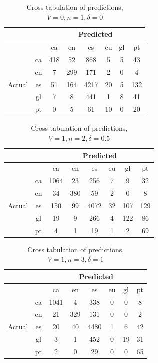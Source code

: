 \documentclass[runningheads]{llncs}
\begin{document}
\begin{table}
	\centering
	\caption{Cross tabulation of predictions, $V=0, n=1, \delta=0$}
	\begin{tabular}{|c|c|c|c|c|c|c|c|} \hline
        & & \multicolumn{6}{c|}{Predicted} \\ \hline
		& &    ca &   en &    es &  eu &   gl &   pt \\ \hline
		\multirow{6}{*}{Actual} & ca   &  418 &   52 &   868 &   5 &   5 &   43 \\
		& en   &    7 &  299 &   171 &   2 &   0 &    4 \\
		& es   &   51 &  164 &  4217 &  20 &   5 &  132 \\
		& gl   &    7 &    8 &   441 &   1 &   8 &   41 \\
		& pt   &    0 &    5 &    61 &  10 &   0 &   20 \\ \hline
		\end{tabular}

\end{table}
\begin{table}
	\centering
	\caption{Cross tabulation of predictions, $V=1, n=2, \delta=0.5$}
	\begin{tabular}{|c|c|c|c|c|c|c|c|} \hline
	    & & \multicolumn{6}{c|}{Predicted} \\ \hline
		& &    ca &   en &    es &  eu &   gl &   pt \\ \hline
		\multirow{6}{*}{Actual} & ca   &  1064 &   23 &   256 &   7 &    9 &   32 \\
		& en   &    34 &  380 &    59 &   2 &    0 &    8 \\
		& es   &   150 &   99 &  4072 &  32 &  107 &  129 \\
		& gl   &    19 &    9 &   266 &   4 &  122 &   86 \\
		& pt   &     4 &    1 &    19 &   1 &    2 &   69 \\ \hline
	\end{tabular}
\end{table}

\begin{table}
	\centering
	\caption{Cross tabulation of predictions, $V=1, n=3, \delta=1$}
	\begin{tabular}{|c|c|c|c|c|c|c|c|} \hline
	    & & \multicolumn{6}{c|}{Predicted} \\ \hline
		& &    ca &   en &    es &  eu &  gl &  pt \\ \hline
		\multirow{6}{*}{Actual} & ca   &  1041 &    4 &   338 &   0 &   0 &   8 \\
		& en   &    21 &  329 &   131 &   0 &   0 &   2 \\
		& es   &    20 &   40 &  4480 &   1 &   6 &  42 \\
		& gl   &     3 &    1 &   452 &   0 &  19 &  31 \\
		& pt   &     2 &    0 &    29 &   0 &   0 &  65 \\ \hline
	\end{tabular}
\end{table}
\end{document}
